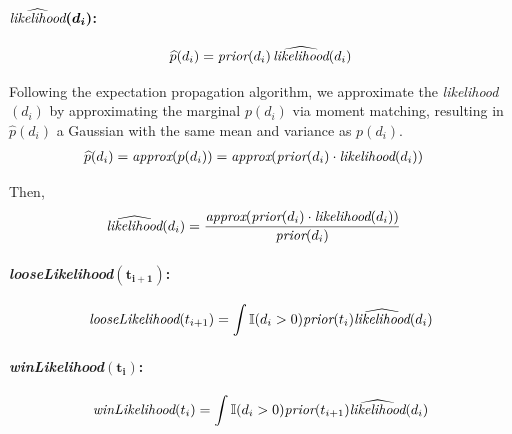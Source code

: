 \documentclass[article]{jss}
\begin{document}
\paragraph{$\bm{\widehat{\emph{likelihood}}(d_i)}$:}

\begin{equation}
\widehat{p}(d_i) = \emph{prior}(d_i) \, \widehat{\emph{likelihood}}(d_i)
\end{equation}

Following the expectation propagation algorithm, we approximate the \emph{likelihood}$(d_i)$ by approximating the marginal $p(d_i)$ via moment matching, resulting in $\widehat{p}(d_i)$ a Gaussian with the same mean and variance as $p(d_i)$.
\begin{equation}
\begin{split}
 \widehat{p}(d_i) & = \emph{approx}(p(d_i)) = \emph{approx}(\emph{prior}(d_i) \cdot \emph{likelihood}(d_i)) 
 \end{split}
\end{equation}

Then, 
\begin{equation}
\begin{split}
\widehat{\emph{likelihood}}(d_i) &= \frac{\emph{approx}(\emph{prior}(d_i) \cdot \emph{likelihood}(d_i))}{ \emph{prior}(d_i)}
\end{split}
\end{equation}

\paragraph{\emph{looseLikelihood}$\bm{(t_{i+1})}$:}

\begin{equation}
 \begin{split}
  \emph{looseLikelihood}(t_{i+1}) = \int \mathbb{I}(d_i>0) \emph{prior}(t_i) \widehat{\emph{likelihood}}(d_i)
 \end{split}
\end{equation}


\paragraph{\emph{winLikelihood}$\bm{(t_{i})}$:}
\begin{equation}
 \begin{split}
  \emph{winLikelihood}(t_{i}) = \int \mathbb{I}(d_i>0) \emph{prior}(t_{i+1}) \widehat{\emph{likelihood}}(d_i)
 \end{split}
\end{equation}
\end{document}
